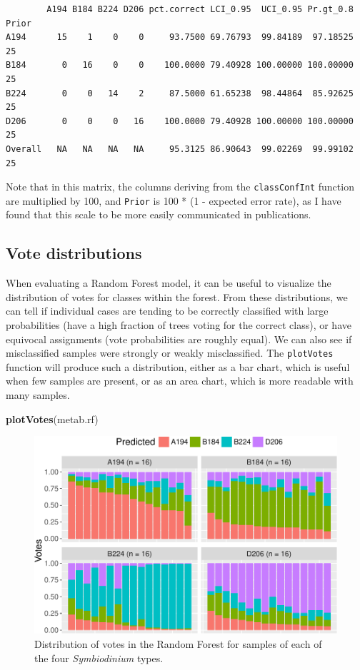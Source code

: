 \documentclass[]{article}
\newenvironment{Shaded}{\begin{snugshade}}{\end{snugshade}}
\newcommand{\KeywordTok}[1]{\textcolor[rgb]{0.13,0.29,0.53}{\textbf{{#1}}}}
\newcommand{\NormalTok}[1]{{#1}}
\begin{document}
\begin{verbatim}
        A194 B184 B224 D206 pct.correct LCI_0.95  UCI_0.95 Pr.gt_0.8 Prior
A194      15    1    0    0     93.7500 69.76793  99.84189  97.18525    25
B184       0   16    0    0    100.0000 79.40928 100.00000 100.00000    25
B224       0    0   14    2     87.5000 61.65238  98.44864  85.92625    25
D206       0    0    0   16    100.0000 79.40928 100.00000 100.00000    25
Overall   NA   NA   NA   NA     95.3125 86.90643  99.02269  99.99102    25
\end{verbatim}

Note that in this matrix, the columns deriving from the
\texttt{classConfInt} function are multiplied by 100, and \texttt{Prior}
is 100 * (1 - expected error rate), as I have found that this scale to
be more easily communicated in publications.

\subsection{Vote distributions}\label{vote-distributions}

When evaluating a Random Forest model, it can be useful to visualize the
distribution of votes for classes within the forest. From these
distributions, we can tell if individual cases are tending to be
correctly classified with large probabilities (have a high fraction of
trees voting for the correct class), or have equivocal assignments (vote
probabilities are roughly equal). We can also see if misclassified
samples were strongly or weakly misclassified. The \texttt{plotVotes}
function will produce such a distribution, either as a bar chart, which
is useful when few samples are present, or as an area chart, which is
more readable with many samples.

\begin{Shaded}
\begin{Highlighting}[]
\KeywordTok{plotVotes}\NormalTok{(metab.rf)}
\end{Highlighting}
\end{Shaded}

\begin{figure}[htbp]
\centering
\includegraphics{rfPermute_ms_files/figure-latex/plotVotes-1.pdf}
\caption{Distribution of votes in the Random Forest for samples of each
of the four \emph{Symbiodinium} types.}
\end{figure}
\end{document}
